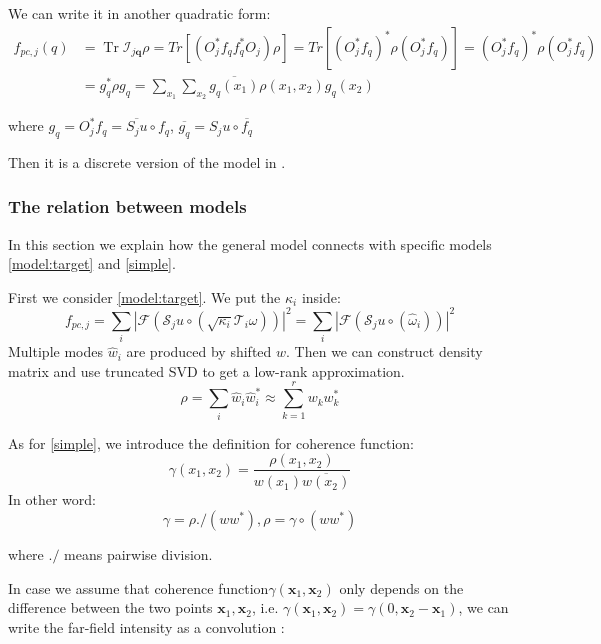 \documentclass{article}
\numberwithin{equation}{section}
\begin{document}
We can write it in another quadratic form:
\begin{equation}
\label{quadratic}
\begin{aligned}
 f_{pc,j}(q) &=  \operatorname{Tr} \mathcal{I}_{j \mathbf{q}} \rho =Tr[(O_j^*f_qf_q^*O_j)\rho]
 = Tr[(O_j^*f_q)^*\rho (O_j^*f_q)] = (O_j^*f_q)^*\rho (O_j^*f_q) \\
 &= g_q^* \rho g_q = \sum_{x_1} \sum _{x_2}  \overline{g_q(x_1)} \rho(x_1,x_2) g_q(x_2)
 \end{aligned}
\end{equation}

where $g_q = O_j^*f_q =  \overline{S_ju} \circ f_q$, $\overline{g_q} = S_ju \circ \overline{f_q}$

Then it is a discrete version of the model in \cite{psf}.  

\subsubsection{The relation between models}
 \label{section:reference}
In this section we explain how the general model connects with specific models \eqref{model:target} and \eqref{simple}. 

First we consider \eqref{model:target}. We put the $\kappa_{i}$ inside:
\begin{equation}
f_{p c, j}=\sum_{i} \left|\mathcal{F}\left( \mathcal{S}_{j} u \circ \left( \sqrt{\kappa_{i}}\mathcal{T}_{i} \omega\right) \right)\right|^{2}
=
\sum_{i} \left|\mathcal{F}\left( \mathcal{S}_{j} u \circ \left( \hat{\omega}_i\right) \right)\right|^{2}
\label{model:gradient decomposition}
\end{equation}
Multiple modes $\hat{w}_i$ are produced by shifted $w$. Then we can construct density matrix and use truncated SVD to get a low-rank approximation. 
$$
\rho = \sum_i \hat{w}_i \hat{w}_i^* \approx \sum_{k=1}^{r} w_k w_k^* 
$$

As for \eqref{simple}, we introduce the definition for coherence function:
$$
\gamma(x_1,x_2) = \dfrac{\rho(x_1,x_2)}{w(x_1) \overline{w(x_2)} }
$$
In other word:
\begin{equation}
\gamma = \rho ./ ( w w^*), \rho = \gamma \circ (ww^*)  
\label{eq: coherence}
\end{equation}



where $./$ means pairwise division.

In case we assume that coherence function$\gamma\left(\mathbf{x}_{1}, \mathbf{x}_{2}\right)$ only depends on the difference between
the two points $\mathbf{x}_{1}, \mathbf{x}_{2}$, i.e. $\gamma\left(\mathbf{x}_{1}, \mathbf{x}_{2}\right)=\gamma\left(0, \mathbf{x}_{2}-\mathbf{x}_{1}\right)$, we can write the far-field intensity as a convolution\cite{psf} :
\end{document}
